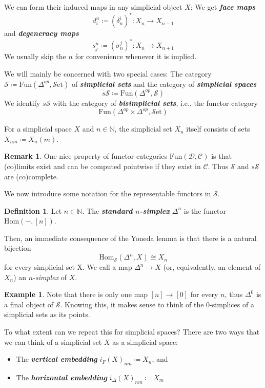 \documentclass{article}
\newcommand{\textbi}[1]{\textbf{\textit{#1}}}
\newcommand{\C}{\mathscr{C}}
\newcommand{\D}{\mathscr{D}}
\newcommand{\bN}{\mathbb{N}}
\newcommand{\cS}{\mathcal{S}}
\newcommand{\Hom}{\mathrm{Hom}}
\newcommand{\Set}{\cS\mathrm{et}}
\newcommand{\sS}{s\cS}
\newcommand{\Fun}{\mathrm{Fun}}
\theoremstyle{definition}
\newtheorem{defin}[subsection]{Definition}
\newtheorem{rem}[subsection]{Remark}
\newtheorem{ex}[subsection]{Example}
\begin{document}
We can form their induced maps in any simplicial object $X$: \newline We get \textbi{face maps} $$d^n_i\coloneqq (\delta_n^i)^*: X_n\to X_{n-1}$$ and \textbi{degeneracy maps} $$s^n_j\coloneqq (\sigma_n^j)^*: X_n\to X_{n+1}$$ 
We usually skip the $n$ for convenience whenever it is implied.

We will mainly be concerned with two special cases: The category $\cS\coloneqq\Fun(\Delta^{op}, \Set)$  of \textbi{simplicial sets} and the category of \textbi{simplicial spaces} $$\sS\coloneqq\Fun(\Delta^{op}, \cS)$$ We identify $\sS$ with the category of \textbi{bisimplicial sets}, i.e., the functor category $$\Fun(\Delta^{op}\times\Delta^{op}, \Set)$$
\par For a simplicial space $X$ and $n\in \bN$, the simplicial set $X_n$ itself consists of sets $X_{nm}\coloneqq X_n(m)$.

\begin{rem}
    One nice property of functor categories $\Fun(\D,\C)$ is that (co)limits exist and can be computed pointwise if they exist in $\C$. Thus $\cS$ and $\sS$ are (co)complete.
\end{rem}

We now introduce some notation for the representable functors in $\cS$.

\begin{defin}
    Let $n\in\bN$. The \textbi{standard $n$-simplex} $\Delta^n$ is the functor $\Hom(-,[n])$.
\end{defin}

Then, an immediate consequence of the Yoneda lemma is that there is a natural bijection $$\Hom_{\cS}(\Delta^n, X)\cong X_n$$ for every simplicial set X. We call a map $\Delta^n\to X$ (or, equivalently, an element of $X_n$) an $n$-\textit{simplex} of $X$. 

\begin{ex}
    Note that there is only one map $[n]\to [0]$ for every $n$, thus $\Delta^0$ is a final object of $\cS$. Knowing this, it makes sense to think of the $0$-simplices of a simplicial sets as its points.
\end{ex}

To what extent can we repeat this for simplicial spaces? There are two ways that we can think of a simplicial set $X$ as a simplicial space: 
\begin{itemize}
    \item The \textbi{vertical embedding} $i_F(X)_{nm}\coloneqq X_n$, and
    \item The \textbi{horizontal embedding} $i_\Delta(X)_{nm}\coloneqq X_m$
\end{itemize}
\end{document}
